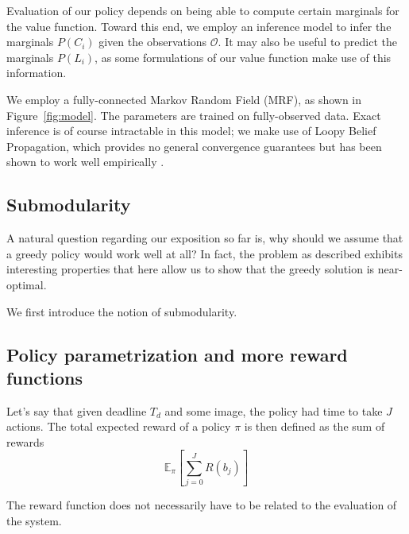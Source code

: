 \documentclass[runningheads]{llncs}
\begin{document}
Evaluation of our policy depends on being able to compute certain marginals for the value function.
Toward this end, we employ an inference model to infer the marginals $P(C_i)$ given the observations $\mathcal{O}$.
It may also be useful to predict the marginals $P(L_i)$, as some formulations of our value function make use of this information.

We employ a fully-connected Markov Random Field (MRF), as shown in Figure~\ref{fig:model}.
The parameters are trained on fully-observed data.
Exact inference is of course intractable in this model; we make use of Loopy Belief Propagation, which provides no general convergence guarantees but has been shown to work well empirically .

\subsection{Submodularity} \label{sec:submodularity}
A natural question regarding our exposition so far is, why should we assume that a greedy policy would work well at all?
In fact, the problem as described exhibits interesting properties that here allow us to show that the greedy solution is near-optimal.

We first introduce the notion of submodularity.


\subsection{Policy parametrization and more reward functions}

Let's say that given deadline $T_d$ and some image, the policy had time to take $J$ actions.
The total expected reward of a policy $\pi$ is then defined as the sum of rewards
\begin{equation}
\mathbb{E}_\pi[\sum_{j=0}^J R(b_j)]
\end{equation}

The reward function does not necessarily have to be related to the evaluation of the system.
\end{document}
